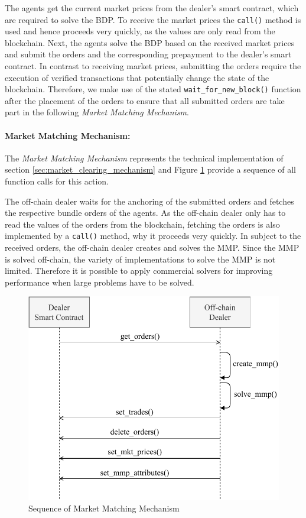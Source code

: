The agents get the current market prices from the dealer's smart contract, which are required to solve 
the BDP.
To receive the market prices the \verb|call()| method is used and hence proceeds very quickly,
as the values are only read from the blockchain.
Next, the agents solve the BDP based on the received market prices and submit 
the orders and the corresponding prepayment to the dealer's smart contract. In contrast to receiving market prices, 
submitting the orders require the execution of verified transactions that potentially
change the state of the blockchain. Therefore, we make use of the stated 
\verb|wait_for_new_block()| function after the placement of the orders to ensure 
that all submitted orders are take part in the following \textit{Market Matching Mechanism}.


\paragraph{Market Matching Mechanism:}
The \textit{Market Matching Mechanism} represents the technical implementation of section 
\ref{sec:market_clearing_mechanism} and Figure \ref{figure:dealers_mmp} provide 
a sequence of all function calls for this action.

The off-chain dealer waits for the anchoring of the submitted orders and fetches the 
respective bundle orders of the agents. 
As the off-chain dealer only has to read the values of the orders from the blockchain,
fetching the orders is also implemented by a \verb|call()| method, why it proceeds very quickly.
In subject to the received orders, the off-chain dealer creates and solves the MMP.
Since the MMP is solved off-chain, the variety of implementations to solve the MMP is 
not limited. Therefore it is possible to apply commercial solvers for improving 
performance when large problems have to be solved.

\begin{figure}[htbp]
	\centering
	\includegraphics[width=.8\linewidth]{./figures/dealers_mmp.pdf}
	\caption{Sequence of Market Matching Mechanism}
	\label{figure:dealers_mmp}
\end{figure}

